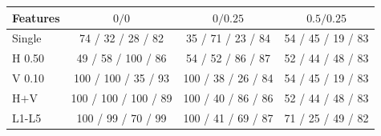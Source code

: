 \begin{tabular}{lccc}
\toprule
Features & $0/0$ & $0/0.25$ & $0.5/0.25$ \\
\midrule
Single & 74 / 32 / 28 / 82 & 35 / 71 / 23 / 84 & 54 / 45 / 19 / 83 \\
H 0.50 & 49 / 58 / 100 / 86 & 54 / 52 / 86 / 87 & 52 / 44 / 48 / 83 \\
V 0.10 & 100 / 100 / 35 / 93 & 100 / 38 / 26 / 84 & 54 / 45 / 19 / 83 \\
H$+$V & 100 / 100 / 100 / 89 & 100 / 40 / 86 / 86 & 52 / 44 / 48 / 83 \\
L1-L5 & 100 / 99 / 70 / 99 & 100 / 41 / 69 / 87 & 71 / 25 / 49 / 82 \\
\bottomrule
\end{tabular}